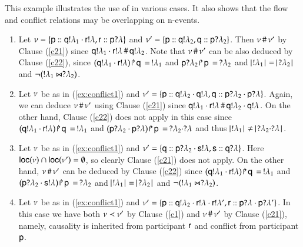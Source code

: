 \begin{example} This example illustrates the use
  of 
   in various cases. It also shows
that the flow and conflict relations may be overlapping on n-events.
%
\begin{enumerate}
\item {} Let
  $\nu=\{{\sf p}:: {\sf q}!\lambda_1\cdot{\sf r}!\lambda,{\sf r}:: {\sf p}?\lambda\}$
  and $\nu'=\{{\sf p}:: {\sf q}!\lambda_2, {\sf q}:: {\sf p}?\lambda_2\}$.  Then
  $\nu \,\#\,\nu '$ by Clause (\ref{c21}) 
since
  ${\sf q}!\lambda_1\cdot{\sf r}!\lambda\,\#\,{\sf q}!\lambda_2$. Note that $\nu \,\#\,\nu '$
  can be also deduced by Clause (\ref{c22}), since
  $({\sf q}!\lambda_1\cdot{\sf r}!\lambda) \! \Rsh \! {\sf q}\, = \,!\lambda_1$ and
  ${\sf p}?\lambda_2 \! \Rsh \! {\sf p}\, = \,?\lambda_2$ and $\cardin{!\la_1} =
  \cardin{?\la_2}$ and $\neg(!\lambda_1\Join ?\lambda_2)$.
%
\item {} 
Let $\nu$ be as in (\ref{ex:conflict1})
and $\nu'=\{{\sf p}:: {\sf q}!\lambda_2\cdot {\sf q}!\lambda,
  {\sf q}:: {\sf p}?\lambda_2\cdot {\sf p}?\lambda\}$. Again, we can deduce
  $\nu \,\#\,\nu '$ using Clause (\ref{c21}) 
  since ${\sf q}!\lambda_1\cdot{\sf r}!\lambda\,\#\,{\sf q}!\lambda_2\cdot {\sf q}!\lambda$.  On the other
  hand, Clause (\ref{c22}) does not apply in this case since
  $({\sf q}!\lambda_1\cdot{\sf r}!\lambda) \! \Rsh \! {\sf q}\, = \,!\lambda_1$ and
  $({\sf p}?\lambda_2\cdot{\sf p}?\lambda) \! \Rsh \! {\sf p}\, = \,?\lambda_2\cdot?\lambda$ and thus
  $\cardin{!\la_1} \neq \cardin{?\la_2\cdot?\la}$.
%
\item {} Let $\nu$ be as in
  (\ref{ex:conflict1}) and
  $\nu'=\{{\sf q}:: {\sf p}?\lambda_2\cdot {\sf s}!\lambda,
    {\sf s}:: {\sf q}?\lambda\}$. Here ${\sf loc}(\nu) \cap {\sf loc}(\nu')
  =\emptyset$, so clearly Clause (\ref{c21}) does not apply.  On the
  other hand, $\nu \,\#\,\nu '$ can be deduced by Clause
  (\ref{c22}) since $({\sf q}!\lambda_1\cdot{\sf r}!\lambda) \! \Rsh \! {\sf q}\, = \,!\lambda_1$
  and $({\sf p}?\lambda_2\cdot{\sf s}!\lambda) \! \Rsh \! {\sf p}\, = \,?\lambda_2$ and
  $\cardin{!\la_1} = \cardin{?\la_2} $ and
  $\neg(!\lambda_1\Join ?\lambda_2)$.  
%


\item {} Let $\nu$ be as in
  (\ref{ex:conflict1}) and $\nu'=\{{\sf p}:: {\sf q}!\lambda_2
\cdot{\sf r}!\lambda \cdot{\sf r}!\lambda', {\sf r}:: {\sf p}?\lambda \cdot{\sf p}?\lambda'\}$.
In this case we have both $\nu\prec\nu'$ by Clause (\ref{c1})
and $\nu\,\#\,\nu'$ by Clause (\ref{c21}), namely, causality
is inherited from participant ${\sf r}$ and conflict from participant ${\sf p}$.
\end{enumerate}
\end{example}


